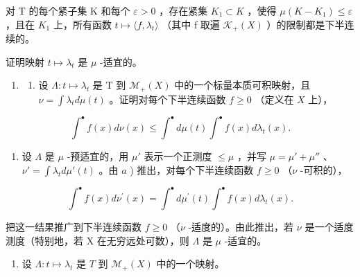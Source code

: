 对 T 的每个紧子集 K 和每个 \(\varepsilon > 0\) ，存在紧集 \(K_{1} \subset K\) ，使得 \(\mu(K - K_{1}) \leqslant \varepsilon\) ，且在 \(K_{1}\) 上，所有函数 \(t \mapsto \langle f, \lambda_{t} \rangle\) （其中 f 取遍 \(\mathcal{K}_{+}(X)\) ）的限制都是下半连续的。

证明映射 \(t \mapsto \lambda_t\) 是 \(\mu\) -适宜的。

\begin{enumerate}
\def\labelenumi{\arabic{enumi})}
\setcounter{enumi}{6}
\tightlist
\item
  \begin{enumerate}
  \def\labelenumii{\alph{enumii})}
  \tightlist
  \item
    设 \(\Lambda : t \mapsto \lambda_t\) 是 T 到 \(\mathcal{M}_{+}(X)\) 中的一个标量本质可积映射，且 \(\nu = \int \lambda_t d\mu(t)\) 。证明对每个下半连续函数 \(f \geqslant 0\) （定义在 \(X\) 上），
  \end{enumerate}
\end{enumerate}

\[
\int^ {\bullet} f (x) d \nu (x) \leqslant \int^ {\bullet} d \mu (t) \int^ {\bullet} f (x) d \lambda_ {t} (x).
\]

\begin{enumerate}
\def\labelenumi{\alph{enumi})}
\setcounter{enumi}{1}
\tightlist
\item
  设 \(\Lambda\) 是 \(\mu\) -预适宜的，用 \(\mu'\) 表示一个正测度 \(\leqslant \mu\) ，并写 \(\mu = \mu' + \mu''\) 、\(\nu' = \int \lambda_t d\mu'(t)\) 。由 \(a\) ) 推出，对每个下半连续函数 \(f \geqslant 0\) （\(\nu\) -可积的），
\end{enumerate}

\[
\int^ {\bullet} f (x) d \nu^ {\prime} (x) = \int^ {\bullet} d \mu^ {\prime} (t) \int^ {\bullet} f (x) d \lambda_ {t} (x).
\]

把这一结果推广到下半连续函数 \(f \geqslant 0\) （\(\nu\) -适度的）。由此推出，若 \(\nu\) 是一个适度测度（特别地，若 X 在无穷远处可数），则 \(\Lambda\) 是 \(\mu\) -适宜的。

\begin{enumerate}
\def\labelenumi{\arabic{enumi})}
\setcounter{enumi}{7}
\tightlist
\item
  设 \(\Lambda : t \mapsto \lambda_t\) 是 \(T\) 到 \(\mathcal{M}_+(X)\) 中的一个映射。
\end{enumerate}

